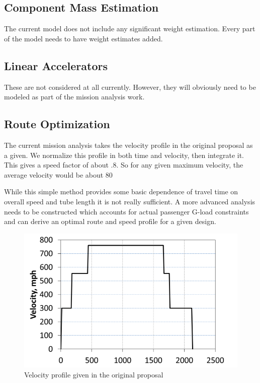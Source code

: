 \documentclass[heading.tex]{subfiles}
\begin{document}
\subsection{Component Mass Estimation}
The current model does not include any significant weight estimation. Every part of the model needs to have weight estimates added.

\subsection{Linear Accelerators}
These are not considered at all currently. However, they will obviously need to be modeled as part of the mission analysis work.

\subsection{Route Optimization}
The current mission analysis takes the velocity profile in the original proposal as a given. We normalize this profile in both time and velocity,
then integrate it. This gives a speed factor of about .8. So for any given maximum velocity, the average velocity would be about 80%

While this simple method provides some basic dependence of travel time on overall speed and tube length it is not really sufficient. A more
advanced analysis needs to be constructed which accounts for actual passenger G-load constraints and can derive an optimal route and
speed profile for a given design.

\begin{figure}[hbtp]
\caption{Velocity profile given in the original proposal}
\centering
\includegraphics[scale=0.5]{images/velocity_profile.png}
\end{figure}
\end{document}
